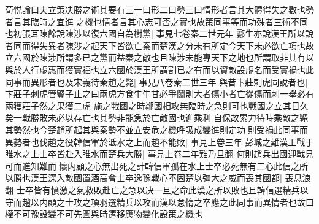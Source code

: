荀悦論曰夫立策决勝之術其要有三一曰形二曰勢三曰情形者言其大體得失之數也勢者言其臨時之宜進之機也情者言其心志可否之實也故策同事等而功殊者三術不同也初張耳陳餘說陳涉以復六國自為樹黨|{
	事見七卷秦二世元年}
酈生亦說漢王所以說者同而得失異者陳涉之起天下皆欲亡秦而楚漢之分未有所定今天下未必欲亡項也故立六國於陳涉所謂多已之黨而益秦之敵也且陳涉未能專天下之地也所謂取非其有以與於人行虚惠而獲實福也立六國於漢王所謂割已之有而以資敵設虛名而受實禍也此同事而異形者也及宋義待秦趙之斃|{
	事見八卷秦二世三年}
與昔卞莊刺虎同說者也|{
	卞莊子刺虎管豎子止之曰兩虎方食牛牛甘必爭鬬則大者傷小者亡從傷而刺一舉必有兩獲莊子然之果獲二虎}
施之戰國之時鄰國相攻無臨時之急則可也戰國之立其日久矣一戰勝敗未必以存亡也其勢非能急於亡敵國也進乘利自保故累力待時乘敵之斃其勢然也今楚趙所起其與秦勢不並立安危之機呼吸成變進則定功則受禍此同事而異勢者也伐趙之役韓信軍於泜水之上而趙不能敗|{
	事見上卷三年}
彭城之難漢王戰于睢水之上士卒皆赴入睢水而楚兵大勝|{
	事見上卷二年難乃旦翻}
何則趙兵出國迎戰見可而進知難而懷内顧之心無出死之計韓信軍孤在水上士卒必死無有二心此信之所以勝也漢王深入敵國置酒高會士卒逸豫戰心不固楚以彊大之威而喪其國都|{
	喪息浪翻}
士卒皆有憤激之氣救敗赴亡之急以决一旦之命此漢之所以敗也且韓信選精兵以守而趙以内顧之士攻之項羽選精兵以攻而漢以怠惰之卒應之此同事而異情者也故曰權不可豫設變不可先圖與時遷移應物變化設策之機也

